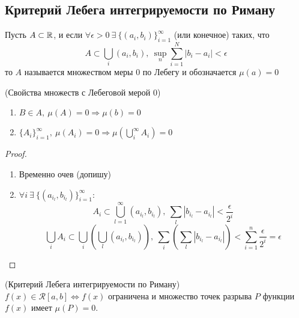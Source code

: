 \subsection{Критерий Лебега интегрируемости по Риману}
\begin{definition}
    Пусть $A\subset \mathbb{R}$, и если $\forall \epsilon>0\ \exists\ \{(a_i,b_i)\}_{i=1}^{\infty}$ (или конечное) таких, что 
    \[A\subset \bigcup\limits_i(a_i,b_i),\ \sup\limits_n \sum\limits_{i=1}^{N}|b_i-a_i|< \epsilon\]
     то $A$ называется множеством меры 0 по Лебегу и обозначается $\mu(a)=0$ 
\end{definition} 
\begin{theorem} (Свойства множеств с Лебеговой мерой 0)\\
    \begin{enumerate}
        \item $B\in A,\ \mu(A)=0 \Rightarrow \mu(b)=0$
        \item $\{A_i\}_{i=1}^{\infty},\ \mu(A_i)=0 \Rightarrow \mu(\bigcup\limits_i^{\infty} A_i)=0$
    \end{enumerate}
\end{theorem} 
\begin{proof}
    \begin{enumerate}
        \item Временно очев (допишу)
        \item $\forall i\ \exists\ \{(a_{i_l},b_{i_l})\}_{i=1}^{\infty}:$
        \[A_i\subset \bigcup\limits_{l=1}^{\infty} (a_{i_l},b_{i_l}),\ \sum\limits_{l} |b_{i_l}-a_{i_l}|<\frac{\epsilon}{2^i}\]
        \[\bigcup\limits_i A_i \subset \bigcup\limits_i\left(\bigcup\limits_l (a_{i_l},b_{i_l})\right),\ \sum\limits_{i}\left(\sum\limits_{l} |b_{i_l}-a_{i_l}|\right)<\sum\limits_{i=1}^{n}\frac{\epsilon}{2^i}=\epsilon\]
    \end{enumerate}
\end{proof} 
\begin{theorem} (Критерий Лебега интегрируемости по Риману)\\
    $f(x)\in \mathcal{R}[a,b] \Leftrightarrow f(x)$ ограничена и множество точек разрыва $P$ функции $f(x)$ имеет $\mu(P)=0$.
\end{theorem} 

